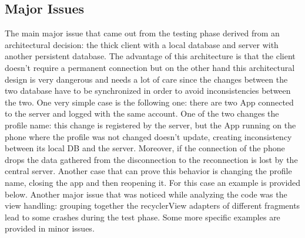 \subsection{Major Issues}
The main major issue that came out from the testing phase derived from an architectural decision: the thick client with a local database and server with another persistent database. The advantage of this architecture is that the client doesn't require a permanent connection but on the other hand this architectural design is very dangerous and needs a lot of care since the changes between the two database have to be synchronized in order to avoid inconsistencies between the two.
One very simple case is the following one: there are two App connected to the server and logged with the same account. One of the two changes the profile name: this change is registered by the server, but the App running on the phone where the profile was not changed doesn't update, creating inconsistency between its local DB and the server.
Moreover, if the connection of the phone drops the data gathered from the disconnection to the reconnection is lost by the central server.
Another case that can prove this behavior is changing the profile name, closing the app and then reopening it. For this case an example is provided below.
Another major issue that was noticed while analyzing the code was the view handling: grouping together the recyclerView adapters of different fragments lead to some crashes during the test phase. Some more specific examples are provided in minor issues.


